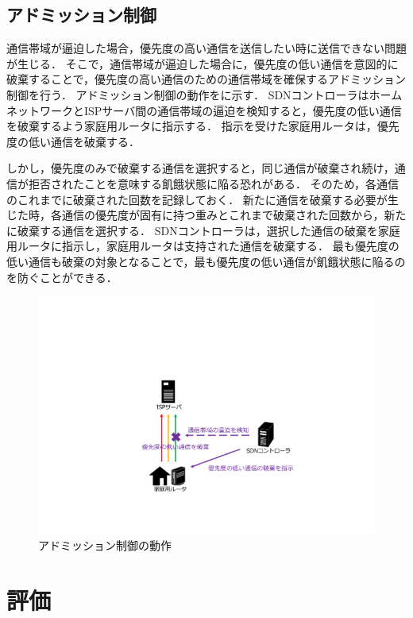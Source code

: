 \documentclass[a4paper,10pt,twocolumn,uplatex]{jsarticle}
\begin{document}
\subsection{アドミッション制御}
通信帯域が逼迫した場合，優先度の高い通信を送信したい時に送信できない問題が生じる．
そこで，通信帯域が逼迫した場合に，優先度の低い通信を意図的に破棄することで，優先度の高い通信のための通信帯域を確保するアドミッション制御を行う．
アドミッション制御の動作をに示す．
SDNコントローラはホームネットワークとISPサーバ間の通信帯域の逼迫を検知すると，優先度の低い通信を破棄するよう家庭用ルータに指示する．
指示を受けた家庭用ルータは，優先度の低い通信を破棄する．\par
しかし，優先度のみで破棄する通信を選択すると，同じ通信が破棄され続け，通信が拒否されたことを意味する飢餓状態に陥る恐れがある．
そのため，各通信のこれまでに破棄された回数を記録しておく．
新たに通信を破棄する必要が生じた時，各通信の優先度が固有に持つ重みとこれまで破棄された回数から，新たに破棄する通信を選択する．
SDNコントローラは，選択した通信の破棄を家庭用ルータに指示し，家庭用ルータは支持された通信を破棄する．
最も優先度の低い通信も破棄の対象となることで，最も優先度の低い通信が飢餓状態に陥るのを防ぐことができる．

\begin{figure}[t]
	\begin{centering}
    \includegraphics[width=0.8\linewidth]{img/adomission_resume.pdf}
    \caption{アドミッション制御の動作}
    \label{fig:adomission}
    \end{centering}
\end{figure}

\section{評価}
\end{document}
